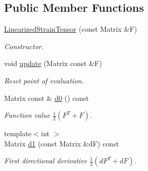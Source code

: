 \subsection*{Public Member Functions}
\begin{DoxyCompactItemize}
\item 
\hyperlink{classRFFGen_1_1LinearAlgebra_1_1LinearizedStrainTensor_a70feeb97bdd239df94760da3ee493a44}{Linearized\-Strain\-Tensor} (const Matrix \&F)
\begin{DoxyCompactList}\small\item\em Constructor. \end{DoxyCompactList}\item 
\hypertarget{classRFFGen_1_1LinearAlgebra_1_1LinearizedStrainTensor_a56675ad7e1c0cf4f4c92fb06b4b003b5}{void \hyperlink{classRFFGen_1_1LinearAlgebra_1_1LinearizedStrainTensor_a56675ad7e1c0cf4f4c92fb06b4b003b5}{update} (Matrix const \&F)}\label{classRFFGen_1_1LinearAlgebra_1_1LinearizedStrainTensor_a56675ad7e1c0cf4f4c92fb06b4b003b5}

\begin{DoxyCompactList}\small\item\em Reset point of evaluation. \end{DoxyCompactList}\item 
\hypertarget{classRFFGen_1_1LinearAlgebra_1_1LinearizedStrainTensor_a12078ba0d36e115a44b126b0c22b9773}{Matrix const \& \hyperlink{classRFFGen_1_1LinearAlgebra_1_1LinearizedStrainTensor_a12078ba0d36e115a44b126b0c22b9773}{d0} () const }\label{classRFFGen_1_1LinearAlgebra_1_1LinearizedStrainTensor_a12078ba0d36e115a44b126b0c22b9773}

\begin{DoxyCompactList}\small\item\em Function value $ \frac{1}{2}\left(F^T+F\right) $. \end{DoxyCompactList}\item 
\hypertarget{classRFFGen_1_1LinearAlgebra_1_1LinearizedStrainTensor_a62288bd627caf2cf7878d7eed0856d13}{{\footnotesize template$<$int $>$ }\\Matrix \hyperlink{classRFFGen_1_1LinearAlgebra_1_1LinearizedStrainTensor_a62288bd627caf2cf7878d7eed0856d13}{d1} (const Matrix \&d\-F) const }\label{classRFFGen_1_1LinearAlgebra_1_1LinearizedStrainTensor_a62288bd627caf2cf7878d7eed0856d13}

\begin{DoxyCompactList}\small\item\em First directional derivative $ \frac{1}{2}\left(dF^T+dF\right) $. \end{DoxyCompactList}\end{DoxyCompactItemize}



